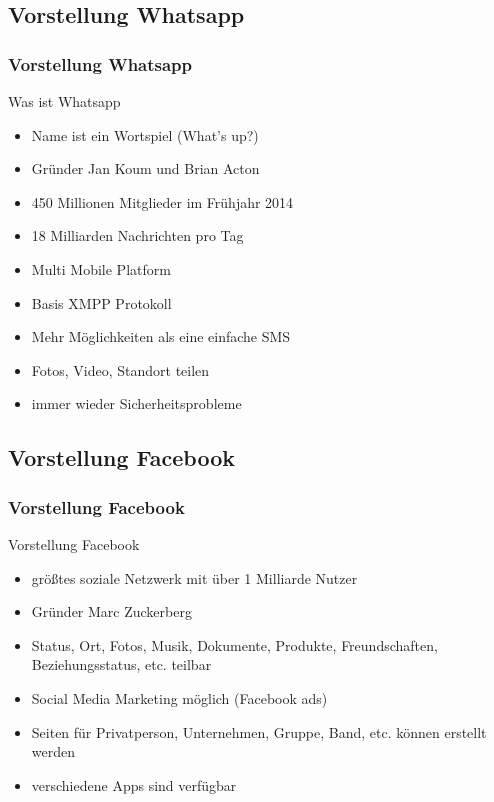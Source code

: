\documentclass[xcolor=dvipsnames]{beamer}
\begin{document}
\subsection{Vorstellung Whatsapp}
\begin{frame} %
  \frametitle{Vorstellung Whatsapp} %
  \begin{block}{Was ist Whatsapp}
	  \begin{itemize}
	  	\item Name ist ein Wortspiel (What's up?)
		\item Gründer Jan Koum und Brian Acton
		\item 450 Millionen Mitglieder im Frühjahr 2014
		\item 18 Milliarden Nachrichten pro Tag
		\item Multi Mobile Platform
		\item Basis XMPP Protokoll
		\item Mehr Möglichkeiten als eine einfache SMS
		\item Fotos, Video, Standort teilen
		\item immer wieder Sicherheitsprobleme
	  \end{itemize}
  \end{block}
\end{frame}


\subsection{Vorstellung Facebook}
\begin{frame} %
  \frametitle{Vorstellung Facebook} %
  \begin{block}{Vorstellung Facebook}
	  \begin{itemize}
	  	\item größtes soziale Netzwerk mit über 1 Milliarde Nutzer
		\item Gründer Marc Zuckerberg
		\item Status, Ort, Fotos, Musik, Dokumente, Produkte, Freundschaften, Beziehungsstatus, etc. teilbar
		\item Social Media Marketing möglich (Facebook ads)
		\item Seiten für Privatperson, Unternehmen, Gruppe, Band, etc. können erstellt werden
		\item verschiedene Apps sind verfügbar
	  \end{itemize}
  \end{block}
\end{frame}
\end{document}
